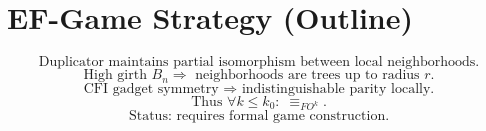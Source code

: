 \documentclass{article}
\begin{document}
\section*{EF-Game Strategy (Outline)}
\[
\text{Duplicator maintains partial isomorphism between local neighborhoods.}
\]
\[
\text{High girth }B_n\Rightarrow\text{ neighborhoods are trees up to radius }r.
\]
\[
\text{CFI gadget symmetry }\Rightarrow\text{ indistinguishable parity locally.}
\]
\[
\text{Thus }\forall k\le k_0:\;\equiv_{FO^k}.
\]
\[
\text{Status: requires formal game construction.}
\]
\end{document}
